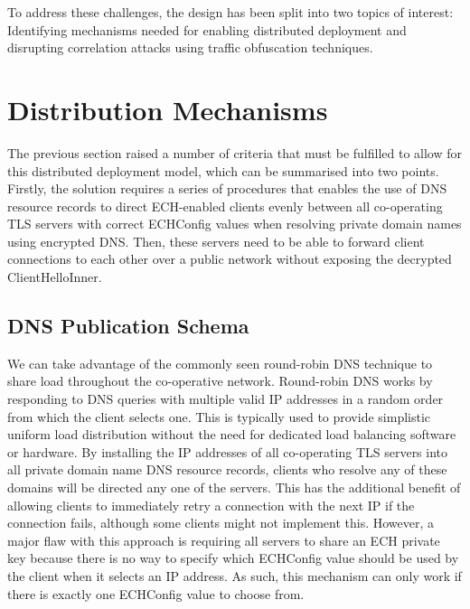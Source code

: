 To address these challenges, the design has been split into two topics of interest: Identifying mechanisms needed for enabling distributed deployment and disrupting correlation attacks using traffic obfuscation techniques.






\section{Distribution Mechanisms}

The previous section raised a number of criteria that must be fulfilled to allow for this distributed deployment model, which can be summarised into two points. Firstly, the solution requires a series of procedures that enables the use of DNS resource records to direct ECH-enabled clients evenly between all co-operating TLS servers with correct ECHConfig values when resolving private domain names using encrypted DNS. Then, these servers need to be able to forward client connections to each other over a public network without exposing the decrypted ClientHelloInner.

\subsection{DNS Publication Schema}

We can take advantage of the commonly seen round-robin DNS technique to share load throughout the co-operative network. Round-robin DNS works by responding to DNS queries with multiple valid IP addresses in a random order from which the client selects one. This is typically used to provide simplistic uniform load distribution without the need for dedicated load balancing software or hardware. By installing the IP addresses of all co-operating TLS servers into all private domain name DNS resource records, clients who resolve any of these domains will be directed any one of the servers. This has the additional benefit of allowing clients to immediately retry a connection with the next IP if the connection fails, although some clients might not implement this. However, a major flaw with this approach is requiring all servers to share an ECH private key because there is no way to specify which ECHConfig value should be used by the client when it selects an IP address. As such, this mechanism can only work if there is exactly one ECHConfig value to choose from.


